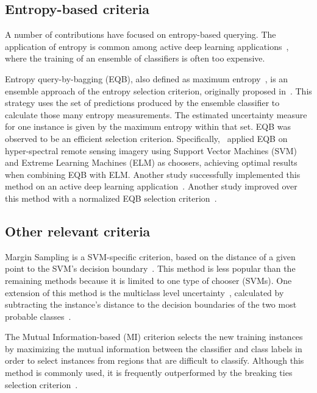 \subsection{Entropy-based criteria}

A number of contributions have focused on entropy-based querying. The
application of entropy is common among active deep learning
applications~\cite{Aghdam2019}, where the training of an ensemble of
classifiers is often too expensive. 

Entropy query-by-bagging (EQB), also defined as maximum
entropy~\cite{Liu2020}, is an ensemble approach of the entropy selection
criterion, originally proposed in~\cite{Tuia2009}. This strategy uses the set
of predictions produced by the ensemble classifier to calculate those many
entropy measurements. The estimated uncertainty measure for one instance is
given by the maximum entropy within that set. EQB was observed to be an
efficient selection criterion. Specifically,~\cite{Shrivastava2021} applied
EQB on hyper-spectral remote sensing imagery using Support Vector Machines
(SVM) and Extreme Learning Machines (ELM) as choosers, achieving optimal
results when combining EQB with ELM\@. Another study successfully implemented
this method on an active deep learning application~\cite{Liu2020}. Another
study improved over this method with a normalized EQB selection
criterion~\cite{Copa2010}.

\subsection{Other relevant criteria}

Margin Sampling is a SVM-specific criterion, based on the distance of a given
point to the SVM's decision boundary~\cite{Shrivastava2021}. This method is
less popular than the remaining methods because it is limited to one type of
chooser (SVMs). One extension of this method is the multiclass level
uncertainty~\cite{Shrivastava2021}, calculated by subtracting the instance's
distance to the decision boundaries of the two most probable
classes~\cite{Demir2011}.

The Mutual Information-based (MI) criterion selects the new training instances
by maximizing the mutual information between the classifier and class labels
in order to select instances from regions that are difficult to classify.
Although this method is commonly used, it is frequently outperformed by the
breaking ties selection criterion~\cite{Li2011,Liu2018}.

